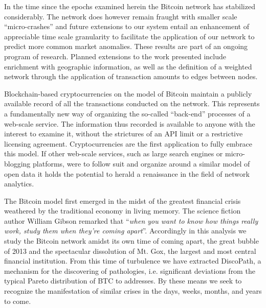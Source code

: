 In the time since the epochs examined herein the Bitcoin network has stabilized considerably. 
The network does however remain fraught with smaller scale ``micro-crashes'' and future extensions to our system entail an enhancement of appreciable time scale granularity to facilitate the application of our network to predict more common market anomalies. 
These results are part of an ongoing program of research.
Planned extensions to the work presented include enrichment with geographic information, as well as the definition of a weighted network through the application of transaction amounts to edges between nodes.

Blockchain-based cryptocurrencies on the model of Bitcoin maintain a publicly available record of all the transactions conducted on the network. 
This represents a fundamentally new way of organizing the so-called ``back-end'' processes of a web-scale service. 
The information thus recorded is available to anyone with the interest to examine it, without the strictures of an API limit or a restrictive licensing agreement.
Cryptocurrencies are the first application to fully embrace this model. 
If other web-scale services, such as large search engines or micro-blogging platforms, were to follow suit and organize around a similar model of open data it holds the potential to herald a renaissance in the field of network analytics.  

The Bitcoin model first emerged in the midst of the greatest financial crisis weathered by the traditional economy in living memory. 
The science fiction author William Gibson remarked that ``\textit{when you want to know how things really work, study them when they're coming apart}''.
Accordingly in this analysis we study the Bitcoin network amidst its own time of coming apart, the great bubble of 2013 and the spectacular dissolution of Mt. Gox, the largest and most central financial institution. 
From this time of turbulence we have extracted DiscoPath, a mechanism for the discovering of pathologies, i.e. significant deviations from the typical Pareto distribution of BTC to addresses.
By these means we seek to recognize the manifestation of similar crises in the days, weeks, months, and years to come.




